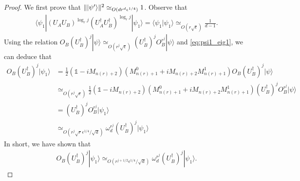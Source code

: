 \documentclass[11pt,letterpaper]{article}
\newcommand{\ket}[1]{|#1\rangle}
\newcommand{\bra}[1]{\langle#1|}
\newcommand{\braket}[2]{\langle#1|#2\rangle}
\newcommand{\ct}{^{\dagger}}
\DeclarePairedDelimiter{\norm}{\lVert}{\rVert}
\newcommand{\1}{\mathbb{1}}
\newcommand{\nr}{n(r)}
\newcommand{\se}{\sqrt{\epsilon}}
\newcommand{\qe}{\epsilon^{1/4}}
\newcommand{\sd}{\sqrt{d}}
\newcommand{\sr}{\sqrt{r}}
\newcommand{\appd}[1]{\simeq_{#1}}
\theoremstyle{definition}
\begin{document}
\begin{proof}
	We first prove that $\norm{\ket{\psi'}}^2 \appd{O(d r^d \qe)} 1$.
	Observe that 
	\begin{align*}
		\bra{\psi_1} (U_AU_B)^{\log_r j} (U_A\ct U_B\ct)^{\log_r j}  \ket{\psi_1} =
		\braket{\psi_1}{\psi_1} \appd{O(r\se)} \frac{1}{d-1}.
	\end{align*}
	Using the relation $O_B(U_B\ct)^j \ket{\psi} \appd{O(r^j \se)} (U_B\ct)^j O_B^{r^j}\ket{\psi}$ and \cref{eq:psi1_eig1}, we can deduce that 
	\begin{align*}
	    O_B (U_B\ct)^j \ket{\psi_1} &= \frac{1}{2} (\1 - iM_{\nr+2})(M_{\nr+1}^0 + i M_{\nr+2}M_{\nr+1}^1)  O_B (U_B\ct)^j \ket{\psi}\\
	                                & \appd{O(r^j \se)} \frac{1}{2} (\1 - iM_{\nr+2})(M_{\nr+1}^0 + i M_{\nr+2}M_{\nr+1}^1) (U_B\ct)^j 
	                                O_B^{r^j} \ket{\psi} \\
	                                & = (U_B\ct)^j O_B^{r^j} \ket{\psi_1} \\
	                                & \appd{O(r^j \sr \qe/ \sd)} \omega_d^{r^j} (U_B\ct)^j\ket{\psi_1}
	\end{align*}
	In short, we have shown that 
    \begin{align}
        \label{eq:B_omega}
        O_B (U_B\ct)^j \ket{\psi_1} \appd{O(r^{j+1/2} \qe/ \sd )} \omega_d^{r^j}  (U_B\ct)^j \ket{\psi_1}.
    \end{align}

\end{proof}
\end{document}
